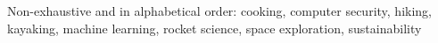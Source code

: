 \documentclass[10pt,a4paper]{article} %
\begin{document}


\inlineheadsection %
{Non-exhaustive and in alphabetical order:}
{cooking, computer security, hiking, kayaking, machine learning,  rocket science, space exploration, sustainability}
\end{document}
